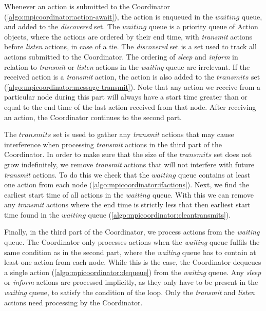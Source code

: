 Whenever an action is submitted to the Coordinator (\autoref{algo:mpicoordinator:action-await}), the action is
enqueued in the $\mathit{waiting}$ queue, and added to the \textit{discovered} set. The $\mathit{waiting}$
queue is a priority queue of Action objects, where the actions are ordered by their end time, with
\textit{transmit} actions before \textit{listen} actions, in case of a tie. The \textit{discovered} set is
a set used to track all actions submitted to the Coordinator. The ordering of \textit{sleep} and
\textit{inform} in relation to \textit{transmit} or \textit{listen} actions in the \textit{waiting} queue are
irrelevant. If the received action is a \textit{transmit} action, the action is also added to the
$\mathit{transmits}$ set (\autoref{algo:mpicoordinator:message-transmit}). Note that any action we receive
from a particular node during this part will always have a start time greater than or equal to the end time of
the last action received from that node. After receiving an action, the Coordinator continues to the second
part. \smallbreak

The $\mathit{transmits}$ set is used to gather any \textit{transmit} actions that may cause interference when
processing \textit{transmit} actions in the third part of the Coordinator. In order to make sure that the size
of the $\mathit{transmits}$ set does not grow indefinitely, we remove \textit{transmit} actions that will not
interfere with future \textit{transmit} actions. To do this we check that the $\mathit{waiting}$ queue
contains at least one action from each node (\autoref{algo:mpicoordinator:ifactions}). Next, we find the
earliest start time of all actions in the $\mathit{waiting}$ queue. With this we can remove any
\textit{transmit} actions where the end time is strictly less that then earliest start time found in the
$\mathit{waiting}$ queue (\autoref{algo:mpicoordinator:cleantransmits}). \smallbreak

Finally, in the third part of the Coordinator, we process actions from the \textit{waiting} queue. The
Coordinator only processes actions when the \textit{waiting} queue fulfils the same condition as in the second
part, where the \textit{waiting} queue has to contain at least one action from each node. While this is the
case, the Coordinator dequeues a single action (\autoref{algo:mpicoordinator:dequeue}) from the
\textit{waiting} queue. Any \textit{sleep} or \textit{inform} actions are processed implicitly, as they only
have to be present in the \textit{waiting} queue, to satisfy the condition of the loop. Only the
\textit{transmit} and \textit{listen} actions need processing by the Coordinator. \smallbreak

